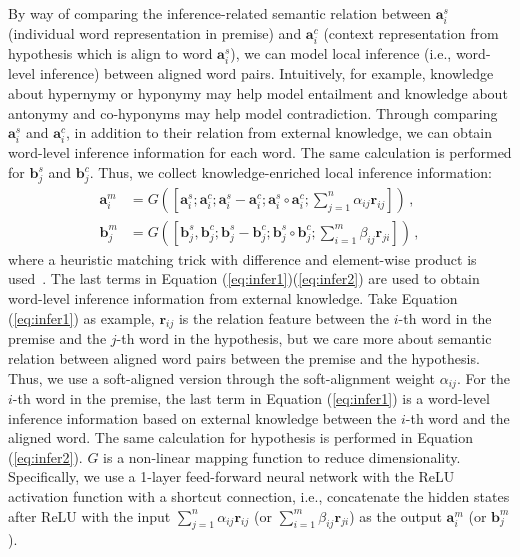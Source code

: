 \documentclass[11pt,a4paper]{article}
\newcommand{\vect}[1]{\bm{#1}}
\begin{document}
By way of comparing the inference-related semantic relation between ${\vect a}_i^s$ (individual word representation in premise) and ${\vect a}_i^c$ (context representation from hypothesis which is align to word ${\vect a}^s_i$), we can model local inference (i.e., word-level inference) between aligned word pairs. Intuitively, for example, knowledge about hypernymy or hyponymy may help model entailment and knowledge about antonymy and co-hyponyms may help model contradiction. Through comparing ${\vect a}^s_i$ and ${\vect a}^c_i$, in addition to their relation from external knowledge, we can obtain word-level inference information for each word. The same calculation is performed for ${\vect b}_j^s$ and ${\vect b}_j^c$. Thus, we collect knowledge-enriched local inference information:
{\fontsize{10pt}{1.0cm}
\begin{align}
\label{eq:infer1}
{\vect a}^m_i &= G([{\vect a}^s_i;{\vect a}^c_i;{\vect a}^s_i - {\vect a}^c_i;{\vect a}^s_i \circ {\vect a}^c_i;\sum_{j=1}^{n} \alpha_{ij} {\vect r}_{ij}]) \,,\\
\label{eq:infer2}
{\vect b}^m_j &= G([{\vect b}^s_j,{\vect b}^c_j;{\vect b}^s_j - {\vect b}^c_j; {\vect b}^s_j \circ {\vect b}^c_j;\sum_{i=1}^{m} \beta_{ij} {\vect r}_{ji}]) \,,
\end{align}
}
\noindent where a heuristic matching trick with difference and element-wise product is used~\citep{DBLP:conf/acl/MouMLX0YJ16,DBLP:conf/acl/ChenZLWJI17}. 
The last terms in Equation (\ref{eq:infer1})(\ref{eq:infer2}) are used to obtain word-level inference information from external knowledge. Take Equation (\ref{eq:infer1}) as example, ${\vect r}_{ij}$ is the relation feature between the $i$-th word in the premise and the $j$-th word in the hypothesis, but we care more about semantic relation between aligned word pairs between the premise and the hypothesis. Thus, we use a soft-aligned version through the soft-alignment weight $\alpha_{ij}$. For the $i$-th word in the premise, the last term in Equation (\ref{eq:infer1}) is a word-level inference information based on external knowledge between the $i$-th word and the aligned word. The same calculation for hypothesis is performed in Equation (\ref{eq:infer2}). $G$ is a non-linear mapping function to reduce dimensionality. Specifically, we use a 1-layer feed-forward neural network with the ReLU activation function with a shortcut connection, i.e., concatenate the hidden states after ReLU with the input $\sum_{j=1}^{n} \alpha_{ij} {\vect r}_{ij}$ (or $\sum_{i=1}^{m} \beta_{ij} {\vect r}_{ji}$) as the output ${\vect a}^m_i$ (or ${\vect b}^m_j$).
\end{document}
